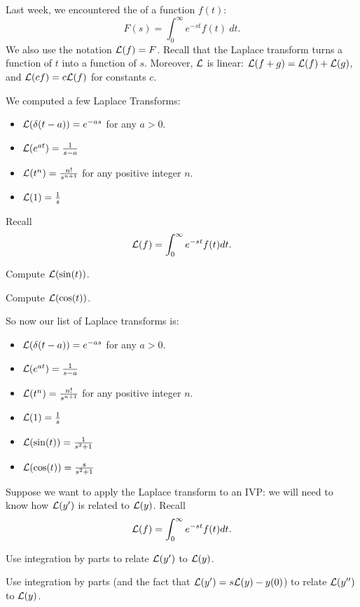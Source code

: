 \begin{applicationActivities}

\begin{observation}
Last week, we encountered the  of a function \(f(t)\):
\[F(s)=\int _0 ^\infty e^{-st}f(t)\ dt.\]
We also use the notation \(\mathcal{L}(f)=F\).
\vfill
Recall that the Laplace transform turns a function of \(t\) into a function of \(s\).
\vfill
Moreover, \(\mathcal{L}\) is linear: \(\mathcal{L}(f+g)=\mathcal{L}(f)+\mathcal{L}(g)\), and \(\mathcal{L}(cf)=c\mathcal{L}(f)\) for constants \(c\).
\end{observation}

\begin{observation}
We computed a few Laplace Transforms:
\begin{itemize}
\item \(\mathcal{L}(\delta(t-a)) = e^{-as}\) for any \(a>0\).
\item \(\mathcal{L}(e^{at}) = \frac{1}{s-a}\) 
\item \(\mathcal{L}(t^n) = \frac{n!}{s^{n+1}}\) for any positive integer \(n\).
\item \(\mathcal{L}(1) = \frac{1}{s}\)
\end{itemize}
\end{observation}

\begin{activity}{10}
Recall \[\mathcal{L}(f)=\int _0 ^\infty e^{-st}f(t)dt.\]
\begin{subactivity}
Compute \(\mathcal{L}(\sin(t))\).
\end{subactivity}
\begin{subactivity}
Compute \(\mathcal{L}(\cos(t))\).
\end{subactivity}
\end{activity}

\begin{observation}
So now our list of Laplace transforms is:
\begin{itemize}
\item \(\mathcal{L}(\delta(t-a)) = e^{-as}\) for any \(a>0\).
\item \(\mathcal{L}(e^{at}) = \frac{1}{s-a}\) 
\item \(\mathcal{L}(t^n) = \frac{n!}{s^{n+1}}\) for any positive integer \(n\).
\item \(\mathcal{L}(1) = \frac{1}{s}\)
\item \(\mathcal{L}(\sin(t)) = \frac{1}{s^2+1}\)
\item \(\mathcal{L}(\cos(t)) = \frac{s}{s^2+1}\)
\end{itemize}
\end{observation}

\begin{activity}{10}
Suppose we want to apply the Laplace transform to an IVP: we will need to know how \(\mathcal{L}(y')\) is related to \(\mathcal{L}(y)\).  Recall
\[\mathcal{L}(f)=\int _0 ^\infty e^{-st}f(t)dt.\]
\vfill
\begin{subactivity}
Use integration by parts to relate \(\mathcal{L}(y')\) to \(\mathcal{L}(y)\).
\end{subactivity}
\begin{subactivity}
Use integration by parts (and the fact that \(\mathcal{L}(y')=s\mathcal{L}(y)-y(0)\)) to relate \(\mathcal{L}(y'')\) to \(\mathcal{L}(y)\).
\end{subactivity}
\end{activity}


\end{applicationActivities}
